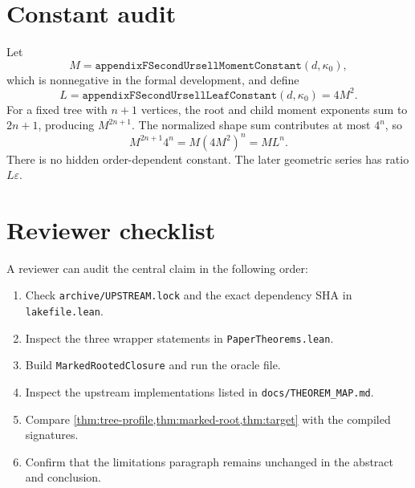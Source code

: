 \documentclass[11pt]{article}
\begin{document}
\section{Constant audit}\label{app:constants}

Let
\[
  M=\texttt{appendixFSecondUrsellMomentConstant}(d,\kappa_0),
\]
which is nonnegative in the formal development, and define
\[
  L=\texttt{appendixFSecondUrsellLeafConstant}(d,\kappa_0)=4M^2.
\]
For a fixed tree with $n+1$ vertices, the root and child moment exponents sum to $2n+1$, producing $M^{2n+1}$.  The normalized shape sum contributes at most $4^n$, so
\[
  M^{2n+1}4^n=M(4M^2)^n=ML^n.
\]
There is no hidden order-dependent constant.  The later geometric series has ratio $L\varepsilon$.

\section{Reviewer checklist}\label{app:review}

A reviewer can audit the central claim in the following order:
\begin{enumerate}[leftmargin=2.5em]
  \item Check \texttt{archive/UPSTREAM.lock} and the exact dependency SHA in \texttt{lakefile.lean}.
  \item Inspect the three wrapper statements in \texttt{PaperTheorems.lean}.
  \item Build \texttt{MarkedRootedClosure} and run the oracle file.
  \item Inspect the upstream implementations listed in \texttt{docs/THEOREM\_MAP.md}.
  \item Compare \cref{thm:tree-profile,thm:marked-root,thm:target} with the compiled signatures.
  \item Confirm that the limitations paragraph remains unchanged in the abstract and conclusion.
\end{enumerate}
\end{document}
